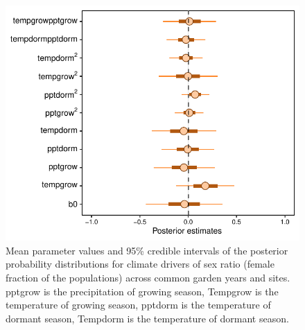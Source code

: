 \documentclass[12pt]{article}\usepackage[]{graphicx}\usepackage[dvipsnames]{xcolor}
\begin{document}
\begin{figure}[H]
	\begin{center}
		\includegraphics[width=0.70\linewidth]{Figures/Posterior_SR.pdf}
		\caption{Mean parameter values and 95\% credible intervals of the posterior probability distributions for climate drivers of sex ratio (female fraction of the populations) across common garden years and sites. 
			pptgrow is  the precipitation of growing season,
			Tempgrow is the temperature of growing season,
			pptdorm is the temperature of dormant season,
			Tempdorm is the temperature of dormant season.}
		\label{Sup:posterior_SR}
	\end{center}
\end{figure}



\end{document}
